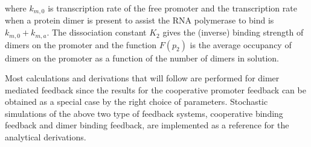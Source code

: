 \documentclass[notitlepage,dvips,rmp,fleqn,superscriptaddress,floatfix]{revtex4-1}
\begin{document}
%
where $k_{m,0}$ is transcription rate of the free promoter and the transcription rate when a protein dimer is present to assist the RNA polymerase to bind is $k_{m,0}+k_{m,a}$. The dissociation constant $K_2$ gives the (inverse) binding strength of dimers on the promoter and the function $F(p_2)$ is the average occupancy of dimers on the promoter as a function of the number of dimers in solution.

Most calculations and derivations that will follow are performed for dimer mediated feedback since the results for the cooperative promoter feedback can be obtained as a special case by the right choice of parameters. Stochastic simulations of the above two type of feedback systems, cooperative binding feedback and dimer binding feedback, are implemented as a reference for the analytical derivations.
\end{document}
